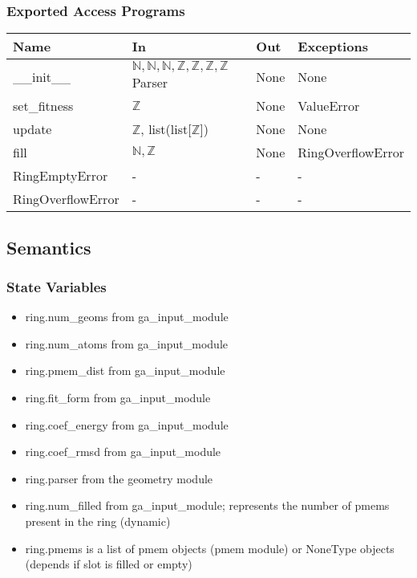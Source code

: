 \documentclass[12pt, titlepage]{article}
\begin{document}
\subsubsection{Exported Access Programs}

\begin{center}
	\begin{tabular}{p{4cm} p{4cm} p{2cm} p{2cm}}
		\hline
		\textbf{Name} & \textbf{In} & \textbf{Out} & \textbf{Exceptions} \\
		\hline
		\_\_init\_\_ & $\mathbb{N}, \mathbb{N}, \mathbb{N}, \mathbb{Z}, 
		\mathbb{Z}, \mathbb{Z}, \mathbb{Z}$ Parser & None & None \\
		set\_fitness & $\mathbb{Z}$ & None & ValueError \\
		update & $\mathbb{Z}$, list(list[$\mathbb{Z}$]) & None & None \\
		fill & $\mathbb{N}, \mathbb{Z}$ & None & RingOverflowError \\
		RingEmptyError  & - & - & - \\
		RingOverflowError & - & - & - \\
		\hline
	\end{tabular}
\end{center}

\subsection{Semantics}

\subsubsection{State Variables}

\begin{itemize}
\item ring.num\_geoms from ga\_input\_module
\item ring.num\_atoms from ga\_input\_module
\item ring.pmem\_dist from ga\_input\_module
\item ring.fit\_form from ga\_input\_module
\item ring.coef\_energy from ga\_input\_module
\item ring.coef\_rmsd from ga\_input\_module
\item ring.parser from the geometry module
\item ring.num\_filled from ga\_input\_module; represents the number of pmems 
present in the ring (dynamic)
\item ring.pmems is a list of pmem objects (pmem module) or NoneType objects 
(depends if slot is filled or empty)
\end{itemize}
\end{document}
